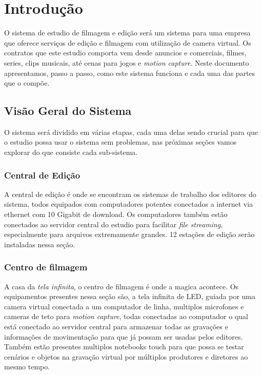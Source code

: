 
\chapter{Introdu\c{c}\~{a}o}
O sistema de estudio de filmagem e edição será um sistema para uma empresa que oferece serviços de edição e filmagem com utilização de camera virtual. Os contratos que este estudio comporta vem desde anuncios e comerciais, filmes, series, clips musicais, até cenas para jogos e \textit{motion capture}.
Neste documento apresentamos, passo a passo, como este sistema funciona e cada uma das partes que o compõe.
\section{Visão Geral do Sistema}
O sistema será dividido em várias etapas, cada uma delas sendo crucial para que o estudio possa usar o sistema sem problemas, nas próximas seções vamos explorar do que consiste cada sub-sistema.
  \subsection{Central de Edição}
  A central de edição é onde se encontram os sistemas de trabalho dos editores do sistema, todos equipados com computadores potentes conectados a internet via ethernet com 10 Gigabit de download. Os computadores também estão conectados ao servidor central do estudio para facilitar \textit{file streaming}, especialmente para arquivos extremamente grandes. 12 estações de edição serão instaladas nessa seção.
  \subsection{Centro de filmagem}
  A casa da \textit{tela infinita}, o centro de filmagem é onde a magica acontece. Os equipamentos presentes nessa seção são, a tela infinita de LED, guiada por uma camera virtual conectada a um computador de linha, multiplos microfones e cameras de teto para \textit{motion capture}, todas conectadas ao computador o qual está conectado ao servidor central para armazenar todas as gravações e informações de movimentação para que já possam ser usadas pelos editores. Também estão presentes multiplos notebooks touch para que possa se testar cenários e objetos na gravação virtual por múltiplos produtores e diretores ao mesmo tempo.
